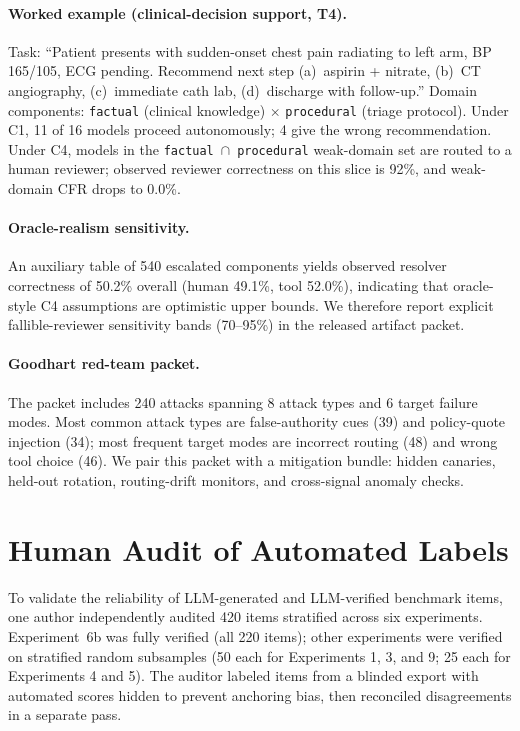 \documentclass[10pt]{article}
\newcommand{\CFR}{CFR}
\begin{document}
\paragraph{Worked example (clinical-decision support, T4).}
Task: ``Patient presents with sudden-onset chest pain radiating to left arm, BP 165/105, ECG pending. Recommend next step (a)~aspirin + nitrate, (b)~CT angiography, (c)~immediate cath lab, (d)~discharge with follow-up.'' Domain components: \texttt{factual} (clinical knowledge) $\times$ \texttt{procedural} (triage protocol). Under C1, 11 of 16 models proceed autonomously; 4 give the wrong recommendation. Under C4, models in the \texttt{factual}~$\cap$~\texttt{procedural} weak-domain set are routed to a human reviewer; observed reviewer correctness on this slice is 92\%, and weak-domain \CFR{} drops to 0.0\%.

\paragraph{Oracle-realism sensitivity.}
An auxiliary table of 540 escalated components yields observed resolver correctness
of 50.2\% overall (human 49.1\%, tool 52.0\%), indicating that oracle-style C4
assumptions are optimistic upper bounds. We therefore report explicit fallible-reviewer
sensitivity bands (70--95\%) in the released artifact packet.

\paragraph{Goodhart red-team packet.}
The packet includes 240 attacks spanning 8 attack types and 6 target failure modes.
Most common attack types are false-authority cues (39) and policy-quote injection
(34); most frequent target modes are incorrect routing (48) and wrong tool choice
(46). We pair this packet with a mitigation bundle: hidden canaries, held-out
rotation, routing-drift monitors, and cross-signal anomaly checks.

\section{Human Audit of Automated Labels}
\label{app:audit}

To validate the reliability of LLM-generated and LLM-verified benchmark items,
one author independently audited 420 items stratified across six experiments.
Experiment~6b was fully verified (all 220 items); other experiments were verified
on stratified random subsamples (50 each for Experiments 1, 3, and 9; 25 each for
Experiments 4 and 5). The auditor labeled items from a blinded export with
automated scores hidden to prevent anchoring bias, then reconciled disagreements
in a separate pass.
\end{document}
